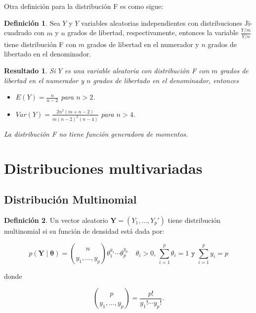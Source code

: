 \documentclass[
  10pt,
  spanish,
]{book}
\providecommand{\tightlist}{%
  \setlength{\itemsep}{0pt}\setlength{\parskip}{0pt}}
\newtheorem{proposition}{Resultado}[chapter]
\theoremstyle{definition}
\newtheorem{definition}{Definición}[chapter]
\theoremstyle{definition}
\theoremstyle{definition}
\theoremstyle{definition}
\theoremstyle{remark}
\begin{document}
Otra definición para la distribución F es como sigue:

\begin{definition}
\protect\hypertarget{def:unnamed-chunk-49}{}{\label{def:unnamed-chunk-49} }Sea \(Y\) y \(Y\) variables aleatorias independientes con distribuciones Ji-cuadrado con \(m\) y \(n\) grados de libertad, respectivamente, entonces la variable \(\frac{Y/m}{Y/n}\) tiene distribución F con \(m\) grados de libertad en el numerador y \(n\) grados de libertado en el denominador.
\end{definition}

\begin{proposition}
\protect\hypertarget{prp:unnamed-chunk-50}{}{\label{prp:unnamed-chunk-50} }Si \(Y\) es una variable aleatoria con distribución F con \(m\) grados de libertad en el numerador y \(n\) grados de libertado en el denominador, entonces

\begin{itemize}
\tightlist
\item
  \(E(Y)=\frac{n}{n-2}\) para \(n>2\).
\item
  \(Var(Y)=\frac{2n^2(m+n-2)}{m(n-2)^2(n-4)}\) para \(n>4\).
\end{itemize}

La distribución F no tiene función generadora de momentos.
\end{proposition}

\hypertarget{distribuciones-multivariadas}{%
\section{Distribuciones multivariadas}\label{distribuciones-multivariadas}}

\hypertarget{distribuciuxf3n-multinomial}{%
\subsection{Distribución Multinomial}\label{distribuciuxf3n-multinomial}}

\begin{definition}
\protect\hypertarget{def:unnamed-chunk-51}{}{\label{def:unnamed-chunk-51} }Un vector aleatorio \(\mathbf{Y}=(Y_1,\ldots,Y_p')\) tiene distribución multinomial si su función de densidad está dada por:

\begin{equation}
p(\mathbf{Y} \mid \boldsymbol \theta)=\binom{n}{y_1,\ldots,y_p}\theta_1^{y_1}\cdots\theta_p^{y_p} \ \ \ \ \ \theta_i>0 \texttt{, } \sum_{i=1}^p\theta_i=1  \texttt{ y } \sum_{i=1}^py_i=p
\end{equation}

donde

\begin{equation}
\binom{p}{y_1,\ldots,y_p}=\frac{p!}{y_1!\cdots y_p!}.
\end{equation}
\end{definition}
\end{document}
